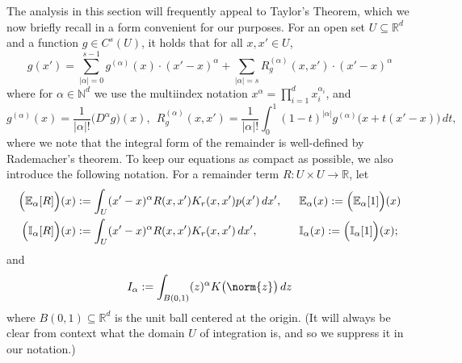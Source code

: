 \documentclass{article}
\newcommand{\Reals}{\mathbb{R}}
\newcommand{\abs}[1]{\left \lvert #1 \right \rvert}
\newcommand{\1}{\mathbf{1}}
\newcommand{\Ebb}{\mathbb{E}}
\newcommand{\Ibb}{\mathbb{I}}
\theoremstyle{alden}
\theoremstyle{aldenthm}
\theoremstyle{definition}
\theoremstyle{remark}
\begin{document}
The analysis in this section will frequently appeal to Taylor's Theorem, which we now briefly recall in a form convenient for our purposes. For an open set $U \subseteq \Reals^d$ and a function $g \in C^{s}(U)$, it holds that for all $x,x' \in U$,
\begin{equation*}
g(x') = \sum_{\abs{\alpha} = 0}^{s - 1} g^{(\alpha)}(x) \cdot (x' - x)^{\alpha}  + \sum_{\abs{\alpha} = s}R_g^{(\alpha)}(x,x') \cdot (x' - x)^{\alpha}
\end{equation*}
where for $\alpha \in \mathbb{N}^d$ we use the multiindex notation $x^{\alpha} = \prod_{i = 1}^{d} x_i^{\alpha_i}$, and
\begin{equation*}
g^{(\alpha)}(x) = \frac{1}{\abs{\alpha}!} \bigl(D^{\alpha}g\bigr)(x),~~ R_g^{(\alpha)}(x,x') = \frac{1}{\abs{\alpha}!} \int_{0}^{1} (1 - t)^{\abs{\alpha}}  g^{(\alpha)}\bigl(x + t(x' - x)\bigr) \,dt,
\end{equation*}
where we note that the integral form of the remainder is well-defined by Rademacher's theorem. To keep our equations as compact as possible, we also introduce the following notation. For a remainder term $R: U \times U \to \Reals$, let
\begin{align*}
\Bigl(\Ebb_{\alpha}[R]\Bigr)(x) & := \int_{U} (x' - x)^{\alpha} R(x,x') K_r(x,x') p(x') \,dx',~~ && \Ebb_{\alpha}(x) := \Bigl(\Ebb_{\alpha}[1]\Bigr)(x) \\
\Bigl(\Ibb_{\alpha}[R]\Bigr)(x) & := \int_{U} (x' - x)^{\alpha} R(x,x') K_r(x,x') \,dx',~~ && \Ibb_{\alpha}(x)  := \Bigl(\Ibb_{\alpha}[1]\Bigr)(x);
\end{align*}
and
\begin{equation*}
I_{\alpha} := \int_{B(0,1)} (z)^{\alpha} K\bigl(\norm{z}\bigr) \,dz
\end{equation*}
where $B(0,1) \subseteq \Reals^d$ is the unit ball centered at the origin. (It will always be clear from context what the domain $U$ of integration is, and so we suppress it in our notation.)  
\end{document}

